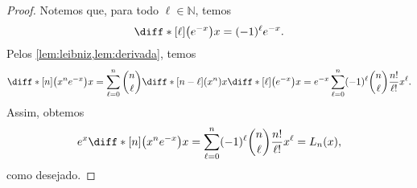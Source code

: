 \begin{proof}
    Notemos que, para todo \(\ell \in \mathbb{N}\), temos
    \begin{equation*}
        \diff*[\ell]{\left(e^{-x}\right)}{x} = (-1)^{\ell}e^{-x}.
    \end{equation*}
    Pelos \cref{lem:leibniz,lem:derivada}, temos
    \begin{equation*}
        \diff*[n]{\left(x^ne^{-x}\right)}{x} = \sum_{\ell = 0}^n \binom{n}{\ell} \diff*[n-\ell]{\left(x^n\right)}{x} \diff*[\ell]{\left(e^{-x}\right)}{x} = e^{-x}\sum_{\ell = 0}^n (-1)^\ell\binom{n}{\ell} \frac{n!}{\ell!}x^\ell.
    \end{equation*}
    Assim, obtemos
    \begin{equation*}
        e^x \diff*[n]{\left(x^ne^{-x}\right)}{x} = \sum_{\ell = 0}^n (-1)^\ell \binom{n}{\ell}\frac{n!}{\ell!} x^\ell = L_n(x),
    \end{equation*}
    como desejado.
\end{proof}

